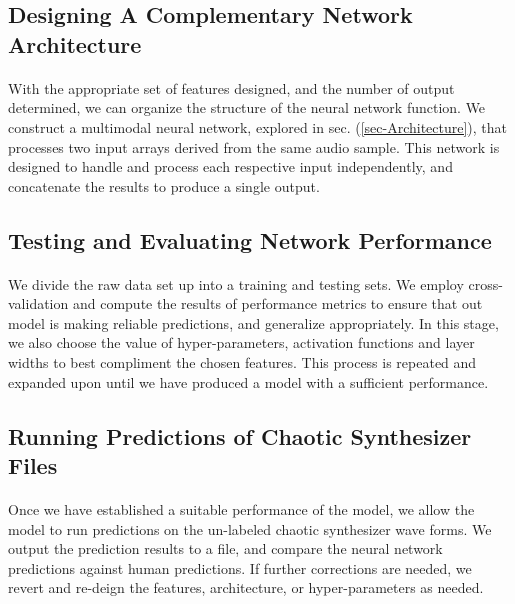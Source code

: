 \documentclass[12pt,letterpaper]{article}
\begin{document}

\subsection{Designing A Complementary Network Architecture}

\paragraph*{}With the appropriate set of features designed, and the number of output determined, we can organize the structure of the neural network function. We construct a multimodal neural network, explored in sec. (\ref{sec-Architecture}), that processes two input arrays derived from the same audio sample. This network is designed to handle and process each respective input independently, and concatenate the results to produce a single output. 


\subsection{Testing and Evaluating Network Performance}

\paragraph*{}We divide the raw data set up into a training and testing sets. We employ cross-validation and compute the results of performance metrics to ensure that out model is making reliable predictions, and generalize appropriately. In this stage, we also choose the value of hyper-parameters, activation functions and layer widths to best compliment the chosen features. This process is repeated and expanded upon until we have produced a model with a sufficient performance.


\subsection{Running Predictions of Chaotic Synthesizer Files}

\paragraph*{}Once we have established a suitable performance of the model, we allow the model to run predictions on the un-labeled chaotic synthesizer wave forms. We output the prediction results to a file, and compare the neural network predictions against human predictions. If further corrections are needed, we revert and re-deign the features, architecture, or hyper-parameters as needed.
\end{document}
